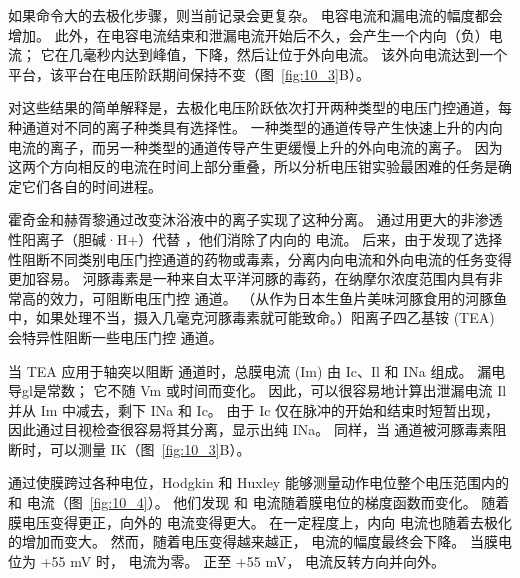 如果命令大的去极化步骤，则当前记录会更复杂。
电容电流和漏电流的幅度都会增加。
此外，在电容电流结束和泄漏电流开始后不久，会产生一个内向（负）电流；
它在几毫秒内达到峰值，下降，然后让位于外向电流。
该外向电流达到一个平台，该平台在电压阶跃期间保持不变（图~\ref{fig:10_3}B）。


对这些结果的简单解释是，去极化电压阶跃依次打开两种类型的电压门控通道，每种通道对不同的离子种类具有选择性。
一种类型的通道传导产生快速上升的内向电流的离子，而另一种类型的通道传导产生更缓慢上升的外向电流的离子。
因为这两个方向相反的电流在时间上部分重叠，所以分析电压钳实验最困难的任务是确定它们各自的时间进程。


霍奇金和赫胥黎通过改变沐浴液中的离子实现了这种分离。
通过用更大的非渗透性阳离子（胆碱·H+）代替 ，他们消除了内向的  电流。
后来，由于发现了选择性阻断不同类别电压门控通道的药物或毒素，分离内向电流和外向电流的任务变得更加容易。
河豚毒素是一种来自太平洋河豚的毒药，在纳摩尔浓度范围内具有非常高的效力，可阻断电压门控  通道。
（从作为日本生鱼片美味河豚食用的河豚鱼中，如果处理不当，摄入几毫克河豚毒素就可能致命。）阳离子四乙基铵 (TEA) 会特异性阻断一些电压门控  通道。


当 TEA 应用于轴突以阻断  通道时，总膜电流 (Im) 由 Ic、Il 和 INa 组成。
漏电导gl是常数； 它不随 Vm 或时间而变化。
因此，可以很容易地计算出泄漏电流 Il 并从 Im 中减去，剩下 INa 和 Ic。
由于 Ic 仅在脉冲的开始和结束时短暂出现，因此通过目视检查很容易将其分离，显示出纯 INa。
同样，当  通道被河豚毒素阻断时，可以测量 IK（图~\ref{fig:10_3}B）。


通过使膜跨过各种电位，Hodgkin 和 Huxley 能够测量动作电位整个电压范围内的  和  电流（图~\ref{fig:10_4}）。
他们发现  和  电流随着膜电位的梯度函数而变化。
随着膜电压变得更正，向外的  电流变得更大。
在一定程度上，内向  电流也随着去极化的增加而变大。
然而，随着电压变得越来越正， 电流的幅度最终会下降。
当膜电位为 +55 mV 时， 电流为零。
正至 +55 mV， 电流反转方向并向外。


